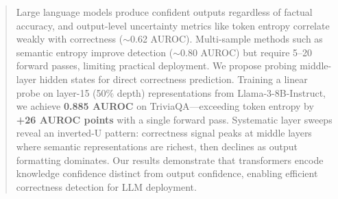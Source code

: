 \begin{abstract}
Large language models produce confident outputs regardless of factual accuracy, and output-level uncertainty metrics like token entropy correlate weakly with correctness ($\sim$0.62 AUROC). Multi-sample methods such as semantic entropy improve detection ($\sim$0.80 AUROC) but require 5--20 forward passes, limiting practical deployment. We propose probing middle-layer hidden states for direct correctness prediction. Training a linear probe on layer-15 (50\% depth) representations from Llama-3-8B-Instruct, we achieve \textbf{0.885 AUROC} on TriviaQA---exceeding token entropy by \textbf{+26 AUROC points} with a single forward pass. Systematic layer sweeps reveal an inverted-U pattern: correctness signal peaks at middle layers where semantic representations are richest, then declines as output formatting dominates. Our results demonstrate that transformers encode knowledge confidence distinct from output confidence, enabling efficient correctness detection for LLM deployment.
\end{abstract}

